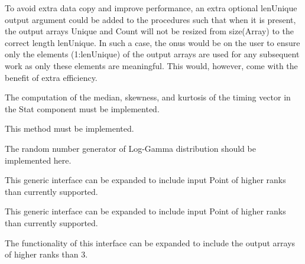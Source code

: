 \begin{DoxyRefList}
\label{todo__todo000026}%
%
 To avoid extra data copy and improve performance, an extra optional {\ttfamily len\+Unique} output argument could be added to the procedures such that when it is present, the output arrays {\ttfamily Unique} and {\ttfamily Count} will not be resized from {\ttfamily size(\+Array)} to the correct length {\ttfamily len\+Unique}. In such a case, the onus would be on the user to ensure only the elements {\ttfamily (1\+:len\+Unique)} of the output arrays are used for any subsequent work as only these elements are meaningful. This would, however, come with the benefit of extra efficiency. 
\item[Subprogram \mbox{\hyperlink{namespaceBench__mod_a614b800597a05c0abca522f81f71769f}{Bench\+\_\+mod\+::time\+Exec}} (Bench, Timing, minsec, miniter)]\label{todo__todo000027}%
%
 The computation of the median, skewness, and kurtosis of the timing vector in the Stat component must be implemented. 
\item[Subprogram \mbox{\hyperlink{namespaceDistMultiNorm__mod_abc50852f3f4a65e6dee14e501df15a60}{Dist\+Multi\+Norm\+\_\+mod\+::logpdf}} (self, Point)]\label{todo__todo000028}%
%
 This method must be implemented. 
\item[Subprogram \mbox{\hyperlink{namespaceDistUniLogGamma__mod_acc6e60c6fa66c784f1f801eb419ecbff}{Dist\+Uni\+Log\+Gamma\+\_\+mod\+::rand}} (self)]\label{todo__todo000029}%
%
 The random number generator of Log-\/\+Gamma distribution should be implemented here.  
\item[Type \mbox{\hyperlink{interfaceDistUniNorm__mod_1_1genNormCDF}{Dist\+Uni\+Norm\+\_\+mod\+::gen\+Norm\+CDF}} ]\label{todo__todo000030}%
%
 This generic interface can be expanded to include input {\ttfamily Point} of higher ranks than currently supported. 
\item[Type \mbox{\hyperlink{interfaceDistUniNorm__mod_1_1genNormLogPDF}{Dist\+Uni\+Norm\+\_\+mod\+::gen\+Norm\+Log\+PDF}} ]\label{todo__todo000031}%
%
 This generic interface can be expanded to include input {\ttfamily Point} of higher ranks than currently supported. 
\item[Type \mbox{\hyperlink{interfaceDistUniNorm__mod_1_1getNormRand}{Dist\+Uni\+Norm\+\_\+mod\+::get\+Norm\+Rand}} ]\label{todo__todo000032}%
%
 The functionality of this interface can be expanded to include the output arrays of higher ranks than 3. 

\end{DoxyRefList}
